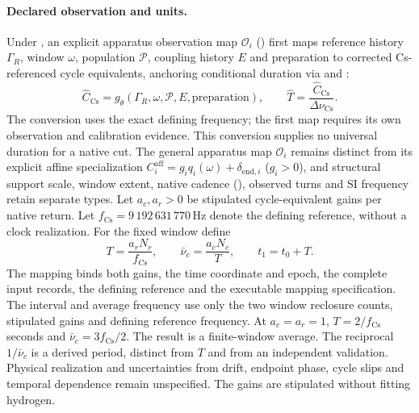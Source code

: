 \paragraph{Declared observation and units.}
Under , an explicit apparatus
observation map \(\mathcal O_i\) ()
first maps reference history \(\Gamma_R\), window \(\omega\), population
\(\mathcal P\), coupling history \(E\) and preparation to corrected
Cs-referenced cycle equivalents, anchoring conditional duration via
 and
:
\begin{equation}
 \widehat C_{\mathrm{Cs}}
   =g_\theta(\Gamma_R,\omega,\mathcal P,E,\mathrm{preparation}),
 \qquad
 \widehat T=\frac{\widehat C_{\mathrm{Cs}}}{\Delta\nu_{\mathrm{Cs}}}.
 \label{eq:manual-m3-cycle-bridge}
\end{equation}
The conversion uses the exact defining frequency; the first map requires
its own observation and calibration evidence. This conversion supplies no
universal duration for a native cut. The general apparatus map \(\mathcal O_i\)
remains distinct from its explicit affine specialization
\(C_i^{\mathrm{aff}}=g_i q_i(\omega)+\delta_{\mathrm{end},i}\) (\(g_i>0\)),
and structural support scale, window extent, native cadence
(), observed turns and SI
frequency retain separate types.
Let \(a_c,a_r>0\) be stipulated cycle-equivalent gains per native return.
Let \(f_{\mathrm{Cs}}=9\,192\,631\,770\,\mathrm{Hz}\) denote the defining
reference, without a clock realization. For the fixed window define
\[
 T=\frac{a_rN_r}{f_{\mathrm{Cs}}},\qquad
 \bar\nu_c=\frac{a_cN_c}{T},\qquad
 t_1=t_0+T.
\]
The mapping binds both gains, the time coordinate and epoch, the complete
input records, the defining reference and the executable mapping specification.
The interval and average frequency use only the two window reclosure counts,
stipulated gains and defining reference frequency.
At \(a_c=a_r=1\), \(T=2/f_{\mathrm{Cs}}\) seconds and
\(\bar\nu_c=3f_{\mathrm{Cs}}/2\).
The result is a finite-window average.
The reciprocal \(1/\bar\nu_c\) is a derived period, distinct from \(T\)
and from an independent validation. Physical realization and uncertainties from
drift, endpoint phase, cycle slips and temporal dependence remain unspecified.
The gains are stipulated without fitting hydrogen.

